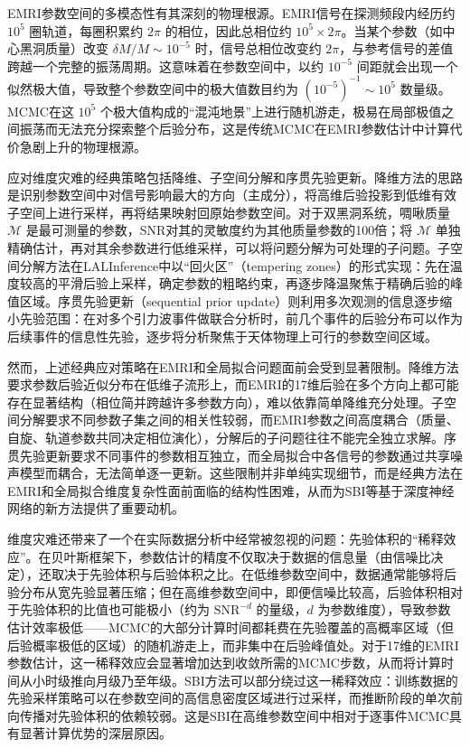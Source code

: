 EMRI参数空间的多模态性有其深刻的物理根源。EMRI信号在探测频段内经历约 $10^5$ 圈轨道，每圈积累约 $2\pi$ 的相位，因此总相位约 $10^5 \times 2\pi$。当某个参数（如中心黑洞质量）改变 $\delta M/M \sim 10^{-5}$ 时，信号总相位改变约 $2\pi$，与参考信号的差值跨越一个完整的振荡周期。这意味着在参数空间中，以约 $10^{-5}$ 间距就会出现一个似然极大值，导致整个参数空间中的极大值数目约为 $(10^{-5})^{-1} \sim 10^5$ 数量级。MCMC在这 $10^5$ 个极大值构成的“混沌地景”上进行随机游走，极易在局部极值之间振荡而无法充分探索整个后验分布，这是传统MCMC在EMRI参数估计中计算代价急剧上升的物理根源。

应对维度灾难的经典策略包括降维、子空间分解和序贯先验更新。降维方法的思路是识别参数空间中对信号影响最大的方向（主成分），将高维后验投影到低维有效子空间上进行采样，再将结果映射回原始参数空间。对于双黑洞系统，啁啾质量 $\mathcal{M}$ 是最可测量的参数，SNR对其的灵敏度约为其他质量参数的100倍；将 $\mathcal{M}$ 单独精确估计，再对其余参数进行低维采样，可以将问题分解为可处理的子问题。子空间分解方法在LALInference中以“回火区”（tempering zones）的形式实现：先在温度较高的平滑后验上采样，确定参数的粗略约束，再逐步降温聚焦于精确后验的峰值区域。序贯先验更新（sequential prior update）则利用多次观测的信息逐步缩小先验范围：在对多个引力波事件做联合分析时，前几个事件的后验分布可以作为后续事件的信息性先验，逐步将分析聚焦于天体物理上可行的参数空间区域。

然而，上述经典应对策略在EMRI和全局拟合问题面前会受到显著限制。降维方法要求参数后验近似分布在低维子流形上，而EMRI的17维后验在多个方向上都可能存在显著结构（相位简并跨越许多参数方向），难以依靠简单降维充分处理。子空间分解要求不同参数子集之间的相关性较弱，而EMRI参数之间高度耦合（质量、自旋、轨道参数共同决定相位演化），分解后的子问题往往不能完全独立求解。序贯先验更新要求不同事件的参数相互独立，而全局拟合中各信号的参数通过共享噪声模型而耦合，无法简单逐一更新。这些限制并非单纯实现细节，而是经典方法在EMRI和全局拟合维度复杂性面前面临的结构性困难，从而为SBI等基于深度神经网络的新方法提供了重要动机。

维度灾难还带来了一个在实际数据分析中经常被忽视的问题：先验体积的“稀释效应”。在贝叶斯框架下，参数估计的精度不仅取决于数据的信息量（由信噪比决定），还取决于先验体积与后验体积之比。在低维参数空间中，数据通常能够将后验分布从宽先验显著压缩；但在高维参数空间中，即便信噪比较高，后验体积相对于先验体积的比值也可能极小（约为 $\text{SNR}^{-d}$ 的量级，$d$ 为参数维度），导致参数估计效率极低——MCMC的大部分计算时间都耗费在先验覆盖的高概率区域（但后验概率极低的区域）的随机游走上，而非集中在后验峰值处。对于17维的EMRI参数估计，这一稀释效应会显著增加达到收敛所需的MCMC步数，从而将计算时间从小时级推向月级乃至年级。SBI方法可以部分绕过这一稀释效应：训练数据的先验采样策略可以在参数空间的高信息密度区域进行过采样，而推断阶段的单次前向传播对先验体积的依赖较弱。这是SBI在高维参数空间中相对于逐事件MCMC具有显著计算优势的深层原因。

